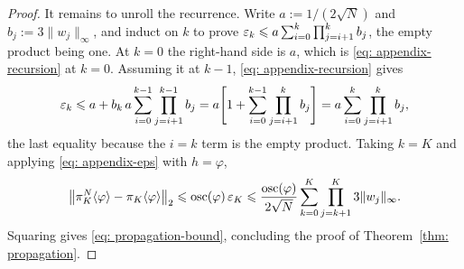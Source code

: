 \documentclass{article}
\begin{document}
\begin{proof}
It remains to unroll the recurrence. Write $a:=1/(2\sqrt N)$ and $b_j:=3\lVert w_j\rVert_\infty$, and induct on $k$ to prove $\varepsilon_k \leqslant a\sum_{i=0}^{k}\prod_{j=i+1}^{k}b_j$, the empty product being one. At $k=0$ the right-hand side is $a$, which is \eqref{eq: appendix-recursion} at $k=0$. Assuming it at $k-1$, \eqref{eq: appendix-recursion} gives
\begin{equation*}
    \varepsilon_k \leqslant a + b_k\,a\sum_{i=0}^{k-1}\prod_{j=i+1}^{k-1}b_j
    = a\Biggl[1+\sum_{i=0}^{k-1}\prod_{j=i+1}^{k}b_j\Biggr]
    = a\sum_{i=0}^{k}\prod_{j=i+1}^{k}b_j ,
\end{equation*}
the last equality because the $i=k$ term is the empty product. Taking $k=K$ and applying \eqref{eq: appendix-eps} with $h=\varphi$,
\begin{equation*}
    \bigl\lVert\pi_K^N\langle \varphi\rangle-\pi_K\langle \varphi\rangle\bigr\rVert_2
    \leqslant \operatorname{osc}(\varphi)\,\varepsilon_K
    \leqslant \frac{\operatorname{osc}(\varphi)}{2\sqrt N}\sum_{k=0}^{K}\prod_{j=k+1}^{K}3\lVert w_j\rVert_\infty .
\end{equation*}
Squaring gives \eqref{eq: propagation-bound}, concluding the proof of Theorem~\ref{thm: propagation}.
\end{proof}
\end{document}
